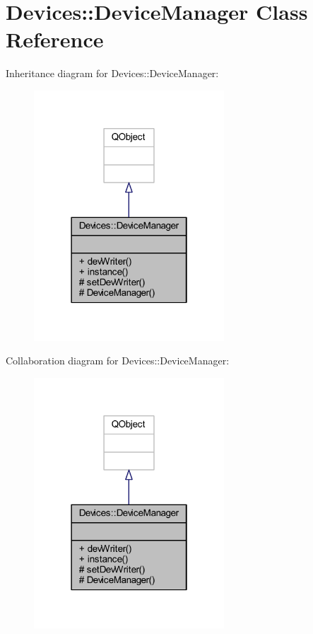 \hypertarget{class_devices_1_1_device_manager}{}\section{Devices\+:\+:Device\+Manager Class Reference}
\label{class_devices_1_1_device_manager}


Inheritance diagram for Devices\+:\+:Device\+Manager\+:\nopagebreak
\begin{figure}[H]
\begin{center}
\leavevmode
\includegraphics[width=202pt]{dd/daf/class_devices_1_1_device_manager__inherit__graph}
\end{center}
\end{figure}


Collaboration diagram for Devices\+:\+:Device\+Manager\+:\nopagebreak
\begin{figure}[H]
\begin{center}
\leavevmode
\includegraphics[width=202pt]{d7/dd0/class_devices_1_1_device_manager__coll__graph}
\end{center}
\end{figure}

